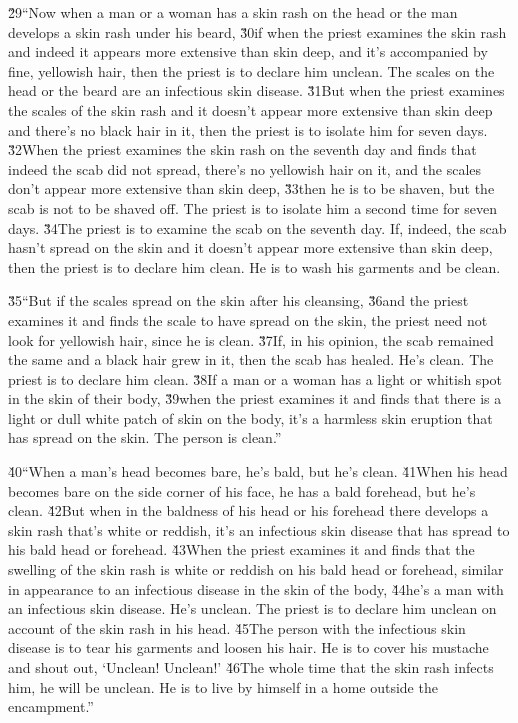 \v{29}``Now when a man or a woman has a skin rash on the head or the man develops a skin rash under his beard, \v{30}if when the priest examines the skin rash and indeed it appears more extensive than skin deep, and it's accompanied by fine, yellowish hair, then the priest is to declare him unclean. The scales on the head or the beard are an infectious skin disease. \v{31}But when the priest examines the scales of the skin rash and it doesn't appear more extensive than skin deep and there's no black hair in it, then the priest is to isolate him for seven days. \v{32}When the priest examines the skin rash on the seventh day and finds that indeed the scab did not spread, there's no yellowish hair on it, and the scales don't appear more extensive than skin deep, \v{33}then he is to be shaven, but the scab is not to be shaved off. The priest is to isolate him a second time for seven days. \v{34}The priest is to examine the scab on the seventh day. If, indeed, the scab hasn't spread on the skin and it doesn't appear more extensive than skin deep, then the priest is to declare him clean. He is to wash his garments and be clean.

\v{35}``But if the scales spread on the skin after his cleansing, \v{36}and the priest examines it and finds the scale to have spread on the skin, the priest need not look for yellowish hair, since he is clean. \v{37}If, in his opinion, the scab remained the same and a black hair grew in it, then the scab has healed. He's clean. The priest is to declare him clean. \v{38}If a man or a woman has a light or whitish spot in the skin of their body, \v{39}when the priest examines it and finds that there is a light or dull white patch of skin on the body, it's a harmless skin eruption that has spread on the skin. The person is clean.''

\v{40}``When a man's head becomes bare, he's bald, but he's clean. \v{41}When his head becomes bare on the side corner of his face, he has a bald forehead, but he's clean. \v{42}But when in the baldness of his head or his forehead there develops a skin rash that's white or reddish, it's an infectious skin disease that has spread to his bald head or forehead. \v{43}When the priest examines it and finds that the swelling of the skin rash is white or reddish on his bald head or forehead, similar in appearance to an infectious disease in the skin of the body, \v{44}he's a man with an infectious skin disease. He's unclean. The priest is to declare him unclean on account of the skin rash in his head. \v{45}The person with the infectious skin disease is to tear his garments and loosen his hair. He is to cover his mustache and shout out, `Unclean! Unclean!' \v{46}The whole time that the skin rash infects him, he will be unclean. He is to live by himself in a home outside the encampment.''

